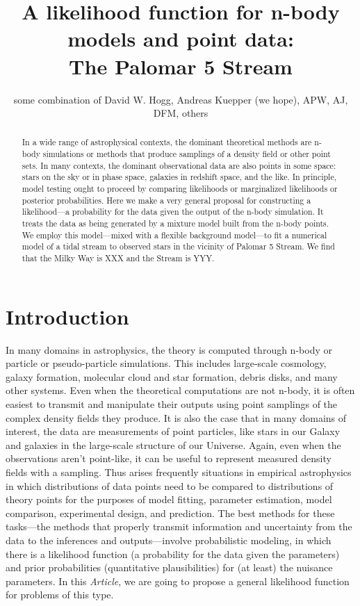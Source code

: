 \documentclass[12pt,pdftex,preprint]{aastex}
\newcommand{\documentname}{\textsl{Article}}
\begin{document}
\title{A likelihood function for n-body models and point data:\\
       The Palomar 5 Stream}
\author{some combination of David W. Hogg, Andreas Kuepper (we hope), APW, AJ, DFM, others}

\begin{abstract}
In a wide range of astrophysical contexts, the dominant theoretical
methods are n-body simulations or methods that produce samplings of a
density field or other point sets.  In many contexts, the dominant
observational data are also points in some space: stars on the sky or
in phase space, galaxies in redshift space, and the like.  In
principle, model testing ought to proceed by comparing likelihoods or
marginalized likelihoods or posterior probabilities.  Here we make a
very general proposal for constructing a likelihood---a probability
for the data given the output of the n-body simulation.  It treats the
data as being generated by a mixture model built from the n-body
points.  We employ this model---mixed with a flexible background
model---to fit a numerical model of a tidal stream to observed stars
in the vicinity of Palomar 5 Stream.  We find that the Milky Way is
XXX and the Stream is YYY.
\end{abstract}

\section{Introduction}

In many domains in astrophysics, the theory is computed through n-body
or particle or pseudo-particle simulations.  This includes large-scale
cosmology, galaxy formation, molecular cloud and star formation,
debris disks, and many other systems.  Even when the theoretical
computations are not n-body, it is often easiest to transmit and
manipulate their outputs using point samplings of the complex density
fields they produce.  It is also the case that in many domains of
interest, the data are measurements of point particles, like stars in
our Galaxy and galaxies in the large-scale structure of our Universe.
Again, even when the observations aren't point-like, it can be useful
to represent measured density fields with a sampling.  Thus arises
frequently situations in empirical astrophysics in which distributions
of data points need to be compared to distributions of theory points
for the purposes of model fitting, parameter estimation, model
comparison, experimental design, and prediction.  The best methods for
these tasks---the methods that properly transmit information and
uncertainty from the data to the inferences and outputs---involve
probabilistic modeling, in which there is a likelihood function (a
probability for the data given the parameters) and prior probabilities
(quantitative plausibilities) for (at least) the nuisance parameters.
In this \documentname, we are going to propose a general likelihood
function for problems of this type.
\end{document}
